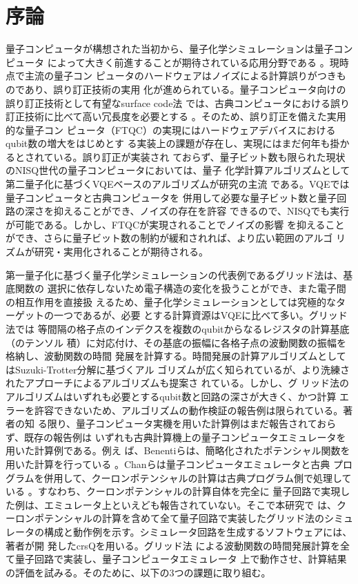 \documentclass[wabun2025.tex]{subfiles}
\begin{document}
\section{序論}
量子コンピュータが構想された当初から、量子化学シミュレーションは量子コンピュータ
によって大きく前進することが期待されている応用分野である
\cite{Cao2019.doi:10.1021/acs.chemrev.8b00803}。現時点で主流の量子コン
ピュータのハードウェアはノイズによる計算誤りがつきものであり、誤り訂正技術の実用
化が進められている。量子コンピュータ向けの誤り訂正技術として有望なsurface code法
では、古典コンピュータにおける誤り訂正技術に比べて高い冗長度を必要とする
\cite{Fowler2012.PhysRevA.86.032324}。そのため、誤り訂正を備えた実用的な量子コン
ピュータ（FTQC）の実現にはハードウェアデバイスにおけるqubit数の増大をはじめとす
る実装上の課題が存在し、実現にはまだ何年も掛かるとされている。誤り訂正が実装され
ておらず、量子ビット数も限られた現状のNISQ世代の量子コンピュータにおいては、量子
化学計算アルゴリズムとして第二量子化に基づくVQEベースのアルゴリズムが研究の主流
である\cite{peruzzo2014variational}。VQEでは量子コンピュータと古典コンピュータを
併用して必要な量子ビット数と量子回路の深さを抑えることができ、ノイズの存在を許容
できるので、NISQでも実行が可能である。しかし、FTQCが実現されることでノイズの影響
を抑えることができ、さらに量子ビット数の制約が緩和されれば、より広い範囲のアルゴ
リズムが研究・実用化されることが期待される。

第一量子化に基づく量子化学シミュレーションの代表例であるグリッド法は、基底関数の
選択に依存しないため電子構造の変化を扱うことができ、また電子間の相互作用を直接扱
えるため、量子化学シミュレーションとしては究極的なターゲットの一つであるが、必要
とする計算資源はVQEに比べて多い\cite{kassal2008.pnas.0808245105}。グリッド法では
等間隔の格子点のインデクスを複数のqubitからなるレジスタの計算基底（のテンソル
積）に対応付け、その基底の振幅に各格子点の波動関数の振幅を格納し、波動関数の時間
発展を計算する。時間発展の計算アルゴリズムとしてはSuzuki-Trotter分解に基づくアル
ゴリズムが広く知られているが、より洗練されたアプローチによるアルゴリズムも提案さ
れている\cite{Berry2015.PhysRevLett.114.090502,
Babbush_2018,YuanSu.PRXQuantum.2.040332, eklund2026.arXiv2603.19007}。しかし、グ
リッド法のアルゴリズムはいずれも必要とするqubit数と回路の深さが大きく、かつ計算
エラーを許容できないため、アルゴリズムの動作検証の報告例は限られている。著者の知
る限り、量子コンピュータ実機を用いた計算例はまだ報告されておらず、既存の報告例は
いずれも古典計算機上の量子コンピュータエミュレータを用いた計算例である。例え
ば、Benentiらは、簡略化されたポテンシャル関数を用いた計算を行っている
\cite{Benenti2008.10.1119/1.2894532}。Chanらは量子コンピュータエミュレータと古典
プログラムを併用して、クーロンポテンシャルの計算は古典プログラム側で処理している
\cite{Chan2023.sciadv.abo7484}。すなわち、クーロンポテンシャルの計算自体を完全に
量子回路で実現した例は、エミュレータ上といえども報告されていない。そこで本研究で
は、クーロンポテンシャルの計算を含めて全て量子回路で実装したグリッド法のシミュ
レータの構成と動作例を示す。シミュレータ回路を生成するソフトウェアには、著者が開
発したcrsQを用いる\cite{takahashi2024.doi:10.1021/acs.jctc.4c00708}。グリッド法
による波動関数の時間発展計算を全て量子回路で実装し、量子コンピュータエミュレータ
上で動作させ、計算結果の評価を試みる。そのために、以下の3つの課題に取り組む。
\end{document}
